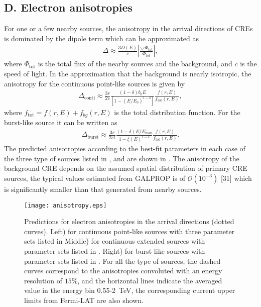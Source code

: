 \subsection{D. Electron anisotropies}
For one or a few nearby sources,
the anisotropy in the arrival directions of CREs 
is dominated by the dipole term which can be approximated as 
\begin{align}
\Delta \approx \frac{3 D(E)}{c}
\left|\frac{\bigtriangledown \Phi_{\text{tot}}}{\Phi_{\text{tot}}}\right|  ,
\end{align}
where  
$\Phi_{\text{tot}}$ is the total flux of the nearby sources and the background,
and $c$ is the speed of light.
In the approximation that the background is nearly isotropic, %
the anisotropy  for the continuous point-like sources  is given by 
\begin{align}
\Delta_{\text{conti}} \approx\frac{3r}{2c}\frac{(1-\delta)b_{0}E }{[1-(E/E_{0})^{1-\delta}]}
\frac{f(r,E)}{f_{\text{tot}}(r,E)}  ,
\end{align}
where $f_{\text{tot}}=f(r,E)+f_{bg}(r,E)$ is the total distribution function.
For the burst-like source it can be written as
\begin{align}
\Delta_{\text{burst}} \approx\frac{3 r}{2ct}\frac{(1-\delta) E/E_{\text{max}}}{1-\xi(E)^{1-\delta}}
\frac{f(r,E)}{f_{\text{tot}}(r,E)}  .
\end{align}
The predicted anisotropies according to the best-fit parameters in each case of 
the three type of sources listed in ,  and  are shown 
in .
The anisotropy of the background CRE depends on the assumed spatial distribution of 
primary CRE sources, the typical values estimated from GALPROP is of $\mathcal{O}(10^{-3})$
[31]
which is significantly smaller than that generated from nearby sources.

\begin{figure}[htb]
\begin{center}
\texttt{[image: anisotropy.eps]}
\caption{
Predictions for electron anisotropies in the arrival directions  (dotted curves).
Left) for continuous point-like sources with three parameter sets 
listed in 
Middle) for continuous extended sources with parameter sets 
listed in .
Right) for burst-like sources with  parameter sets listed in .
For all the type of sources, 
the dashed curves correspond to the anisotropies convoluted with an energy resolution of $15\%$,
and the horizontal lines indicate the averaged value in the energy bin  0.55-2~TeV, 
the corresponding  current upper limits from Fermi-LAT are also shown.
}
\label{fig:anisotropy_DAMPE}
\end{center}
\end{figure}


